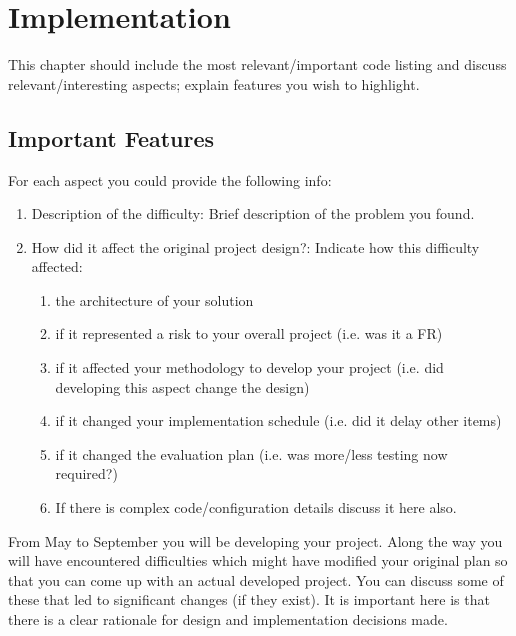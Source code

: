 \chapter{Implementation}
\label{chap:imp}
This chapter should include the most relevant/important code listing and discuss relevant/interesting aspects; explain features you wish to highlight. 

\section{Important Features}
For each aspect you could provide the following info:
\begin{enumerate}
    \item Description of the difficulty: Brief description of the problem you found.
    \item How did it affect the original project design?: Indicate how this difficulty affected:
    \begin{enumerate}
        \item the architecture of your solution
        \item if it represented a risk to your overall project (i.e. was it a FR)
        \item if it affected your methodology to develop your project (i.e. did developing this aspect change the design)
        \item if it changed your implementation schedule (i.e. did it delay other items)
        \item if it changed the evaluation plan (i.e. was more/less testing now required?)
    \item If there is complex code/configuration details discuss it here also.
    \end{enumerate}
\end{enumerate}

From May to September you will be developing your project. Along the way you will have encountered difficulties which might have modified your original plan so that you can come up with an actual developed project. You can discuss some of these that led to significant changes (if they exist). It is important here is that there is a clear rationale for design and implementation decisions made.